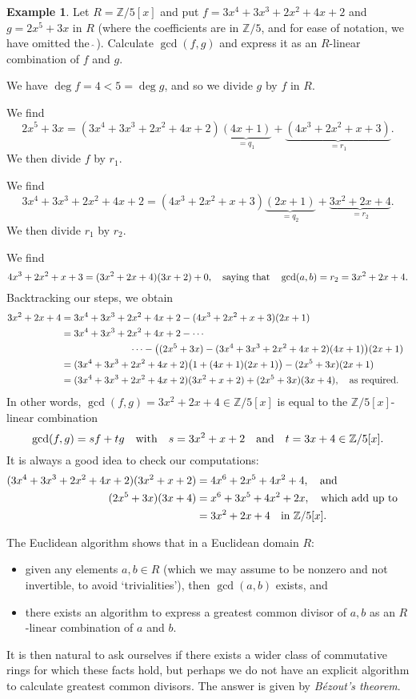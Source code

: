 \documentclass[12pt]{article}
\newcommand{\qbox}[1]{\quad\hbox{#1}\quad}
\theoremstyle{definition}
\newtheorem{example}[thm]{Example}
\newcounter{ex}\renewcommand\theex{\arabic{ex}}
\newcommand{\Z}{\ensuremath{\mathbb{Z}}}
\newcommand{\wh}[1]{\widehat{#1}}
\begin{document}
\begin{example}
Let $R=\Z/5[x]$ and put $f=3x^4+3x^3+2x^2+4x+2$ and
$g=2x^5+3x$ in $R$ (where the coefficients are in $\Z/5$, and for ease
of notation, we have omitted the $\wh{\;}$). Calculate $\gcd(f,g)$ and
express it as an $R$-linear combination of $f$ and $g$.

We have $\deg f=4<5=\deg g$, and so we divide $g$ by $f$ in $R$. 

\vspace{2cm}
We find
$$2x^5+3x=(3x^4+3x^3+2x^2+4x+2)\underbrace{(4x+1)}_{=q_1}+
\underbrace{(4x^3+2x^2+x+3)}_{=r_1}.$$
We then divide $f$ by $r_1$.

\vspace{2cm}
We find 
$$3x^4+3x^3+2x^2+4x+2=(4x^3+2x^2+x+3)\underbrace{(2x+1)}_{=q_2}+
\underbrace{3x^2+2x+4}_{=r_2}.$$
We then divide $r_1$ by $r_2$.

\vspace{2cm}
We find 
$$4x^3+2x^2+x+3=(3x^2+2x+4)(3x+2)+0,\qbox{saying that}
\gcd(a,b)=r_2=3x^2+2x+4.$$
Backtracking our steps, we obtain
\begin{align*}
3x^2+2x+4&=
3x^4+3x^3+2x^2+4x+2-(4x^3+2x^2+x+3)(2x+1)\\
&=3x^4+3x^3+2x^2+4x+2-\cdots\\
&\hspace{2.5cm}\cdots-\big(
(2x^5+3x)-(3x^4+3x^3+2x^2+4x+2)(4x+1)\big)(2x+1)\\
&=(3x^4+3x^3+2x^2+4x+2)\big(1+(4x+1)(2x+1)\big)-
(2x^5+3x)(2x+1)\\
&=(3x^4+3x^3+2x^2+4x+2)(3x^2+x+2)+(2x^5+3x)(3x+4),\qbox{as required.}
\end{align*}
In other words,
$\gcd(f,g)=3x^2+2x+4\in\Z/5[x]$ is equal to the $\Z/5[x]$-linear combination
$$\gcd(f,g)=sf+tg\qbox{with}s=3x^2+x+2\qbox{and}t=3x+4\in\Z/5[x].$$
It is always a good idea to check our computations:
\begin{align*}
(3x^4+3x^3+2x^2+4x+2)(3x^2+x+2)&=4x^6+2x^5+4x^2+4,\qbox{and}\\
(2x^5+3x)(3x+4)&=x^6+3x^5+4x^2+2x,\qbox{which add up to}\\
&=3x^2+2x+4\qbox{in $\Z/5[x]$.}
\end{align*}

\end{example}

\smallskip
The Euclidean algorithm shows that in a Euclidean domain $R$:
\begin{itemize}
\item given any elements $a,b\in R$ (which we may assume to be nonzero
and not invertible, to avoid `trivialities'), then $\gcd(a,b)$ exists,
and
\item there exists an algorithm to express a greatest common divisor
of $a,b$ as an $R$-linear combination of $a$ and $b$.
\end{itemize}
It is then natural to ask ourselves if there exists a wider class of
commutative rings for which these facts hold, but perhaps we do not
have an explicit algorithm to calculate greatest common divisors. The
answer is given by {\em B\'ezout's theorem}.
\end{document}
